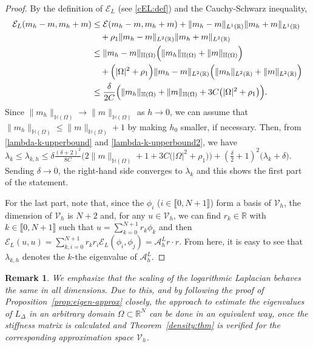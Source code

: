 \documentclass[11 pt]{article}
\newcommand\inter[1]{\llbracket #1\rrbracket}
\newtheorem{remark}[theorem]{Remark}
\numberwithin{equation}{section}
\def\R{\mathbb{R}}
\def\mH{\mathbb{H}}
\begin{document}
\begin{proof}
By the definition of $\mathcal{E}_L$ (see \eqref{cEL:def}) and the Cauchy-Schwarz inequality,
% 
\begin{align}\notag 
\mathcal{E}_L(m_h-m,m_h+m)&\leq \mathcal{E}(m_h-m,m_h+m)+\|m_h-m\|_{L^1(\R)}\|m_h+m\|_{L^1(\R)}\\ \notag
&\quad +\rho_1\|m_h-m\|_{L^2(\R)}\|m_h+m\|_{L^2(\R)}\notag \\
&\leq \|m_h-m\|_{\mH(\Omega)}\Big(\|m_h\|_{\mH(\Omega)}+\|m\|_{\mH(\Omega)}\Big)\notag \\ 
&\quad +\Big(|\Omega|^2+\rho_1\Big)\|m_h-m\|_{L^2(\R)}\Big(\|m_h\|_{L^2(\R)}+\|m\|_{L^2(\R)}\Big)\notag\\
&\leq \frac{\delta}{2C}\Big(\|m_h\|_{\mH(\Omega)}+\|m\|_{\mH(\Omega)}+3C\big(|\Omega|^2+\rho_1\big)\Big).\label{lambda-k-upperbound2}
\end{align}
%
Since $\|m_h\|_{\mH(\Omega)}\to \|m\|_{\mH(\Omega)}$ as $h\to 0$, we can assume that
$\|m_h\|_{\mH(\Omega)}\leq \|m\|_{\mH(\Omega)}+1$ by making $h_0$ smaller, if necessary. Then, from \eqref{lambda-k-upperbound} and \eqref{lambda-k-upperbound2}, we have $\lambda_k\leq \lambda_{k,h}
\leq 
\delta\frac{(\delta+2)^2}{8C}\Big(2\|m\|_{\mH(\Omega)}+1+3C\big(|\Omega|^2+\rho_1\big)\Big)
+
\left( \frac{\delta}{2}+1\right)^2\big(\lambda_k+\delta\big).$ Sending $\delta\to 0$, the right-hand side converges to $\lambda_k$ and this shows the first part of the statement.

For the last part, note that, since the $\phi_i$ ($i\in\inter{0,N+1}$) form a basis of $\mathcal{V}_h$, the dimension of $\mathcal{V}_{h}$ is $N+2$ and, for any $u\in \mathcal{V}_{h}$, we can find $r_k\in \R$ with $k\in \inter{0,N+1}$ such that $u=\sum_{k=0}^{N+1}r_k\phi_k$ and then $\mathcal{E}_L(u,u)=\sum_{k,i=0}^{N+1}r_kr_i\mathcal{E}_L(\phi_i,\phi_j)= \mathcal{A}^L_h r\cdot r.$ From here, it is easy to see that $\lambda_{k,h}$ denotes the $k$-the eigenvalue of $\mathcal{A}^L_{h}$.
\end{proof}



\begin{remark}
We emphasize that the scaling of the logarithmic Laplacian behaves the same in all dimensions. Due to this, and by following the proof of Proposition~\ref{prop:eigen-approx} closely, the approach to estimate the eigenvalues of $L_{\Delta}$ in an arbitrary domain $\Omega\subset\R^N$ can be done in an equivalent way, once the stiffness matrix is calculated and Theorem~\ref{density:thm} is verified for the corresponding approximation space $\mathcal{V}_h$.
\end{remark}
\end{document}
